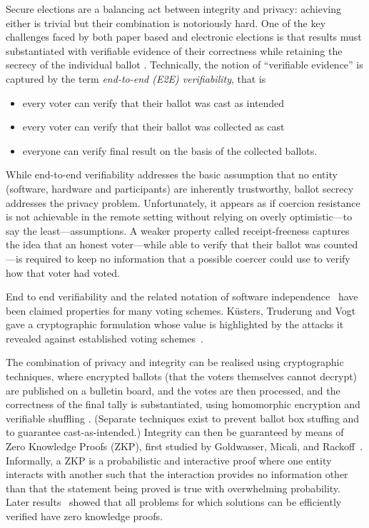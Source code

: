 \documentclass{llncs}
\begin{document}
Secure elections are a balancing act between integrity and privacy:
achieving either is trivial but their combination is notoriously hard.
One of the key challenges faced by both paper based and electronic
elections is that results must substantiated with
verifiable evidence of their correctness while retaining the secrecy
of the individual ballot \cite{Bernhard:2017:PES}.  Technically, the
notion of ``verifiable evidence'' is captured by the term 
\emph{end-to-end (E2E) verifiability}, that is
\begin{itemize}
  \item every voter can verify that their ballot was cast as
  intended
  \item every voter can verify that their ballot was collected as
  cast
  \item everyone can verify final result on the basis of the
  collected ballots.
\end{itemize}
While end-to-end verifiability addresses the basic assumption that
no entity (software, hardware and participants) are inherently
trustworthy, ballot secrecy addresses the privacy problem.
Unfortunately, it appears as if coercion resistance is not achievable  
in the remote setting without relying on overly optimistic---to say the least---assumptions.
A weaker property called receipt-freeness captures the idea that an honest 
voter---while able to verify that their ballot was counted---is required to keep 
no information that a possible coercer could use to verify how that voter had voted.

End to end verifiability and the related notation of software independence~\cite{Rivest:2008:PTRS}
 have been claimed properties for many voting schemes.
 K{\"u}sters, Truderung and Vogt~\cite{Kusters:2010:CCS} 
 gave
 a cryptographic formulation whose value is highlighted by the attacks it revealed against established voting 
 schemes~\cite{Kusters:2012:SP}.

The combination of privacy and integrity can be realised using cryptographic techniques, where
encrypted ballots (that the voters themselves cannot decrypt) are
published on a bulletin board, and the votes are then processed, and
the correctness of the final tally is substantiated, using
homomorphic encryption \cite{Hirt:2000:ERF} and verifiable shuffling
\cite{Bayer:2012:EZK}. (Separate techniques exist to prevent ballot
box stuffing and to guarantee cast-as-intended.)
Integrity can then be guaranteed by means of Zero Knowledge Proofs
(ZKP),
first studied by Goldwasser, Micali, and Rackoff~\cite{Goldwasser:1985:STOC}.
Informally, a ZKP is a probabilistic and interactive proof where one
entity interacts with another such that the interaction provides
no information other than that the statement being proved is true with
overwhelming probability. 
Later results~\cite{Ben-Or:1988:CRYPTO,Goldreich:1991:ACM}
showed that 
all problems for which solutions can be efficiently verified have zero knowledge
proofs.
\end{document}
